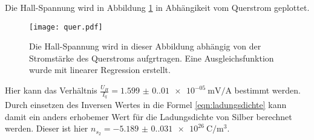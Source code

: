 \noindent Die Hall-Spannung wird in Abbildung \ref{fig:plot} in Abhängikeit vom Querstrom geplottet.


\begin{figure}
  \centering
  \texttt{[image: quer.pdf]}
  \caption{Die Hall-Spannung wird in dieser Abbildung abhängig von der Stromstärke des Querstroms aufgrtragen. Eine Ausgleichsfunktion wurde mit linearer Regression erstellt.}
  \label{fig:plot}
\end{figure}

\noindent Hier kann das Verhältnis $\frac{U_H}{I_q}=\qty{1.599(0.010)e-05}{\milli\volt\per\ampere}$ bestimmt werden.
Durch einsetzen des Inversen Wertes in die Formel \ref{eqn:ladungsdichte} kann damit ein anders erhobemer Wert für die Ladungsdichte von Silber berechnet werden.
Dieser ist hier $n_{s_2}=\qty{-5.189(0.031)e+26}{\coulomb\per\cubic\meter}$.
